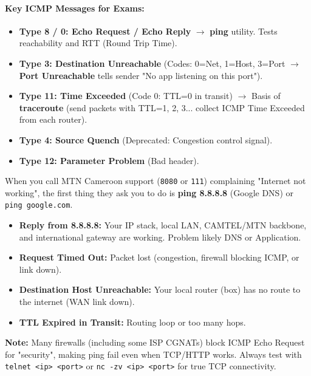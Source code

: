 \documentclass[11pt]{article}
\begin{document}
\paragraph{Key ICMP Messages for Exams:}
\begin{itemize}
    \item \textbf{Type 8 / 0: Echo Request / Echo Reply} $\to$ \textbf{ping} utility. Tests reachability and RTT (Round Trip Time).
    \item \textbf{Type 3: Destination Unreachable} (Codes: 0=Net, 1=Host, 3=Port $\to$ \textbf{Port Unreachable} tells sender "No app listening on this port").
    \item \textbf{Type 11: Time Exceeded} (Code 0: TTL=0 in transit) $\to$ Basis of \textbf{traceroute} (send packets with TTL=1, 2, 3... collect ICMP Time Exceeded from each router).
    \item \textbf{Type 4: Source Quench} (Deprecated: Congestion control signal).
    \item \textbf{Type 12: Parameter Problem} (Bad header).
\end{itemize}

\begin{savaistu}
When you call MTN Cameroon support (\texttt{8080} or \texttt{111}) complaining "Internet not working", the first thing they ask you to do is \textbf{ping 8.8.8.8} (Google DNS) or \texttt{ping google.com}.
\begin{itemize}
    \item \textbf{Reply from 8.8.8.8:} Your IP stack, local LAN, CAMTEL/MTN backbone, and international gateway are working. Problem likely DNS or Application.
    \item \textbf{Request Timed Out:} Packet lost (congestion, firewall blocking ICMP, or link down).
    \item \textbf{Destination Host Unreachable:} Your local router (box) has no route to the internet (WAN link down).
    \item \textbf{TTL Expired in Transit:} Routing loop or too many hops.
\end{itemize}
\textbf{Note:} Many firewalls (including some ISP CGNATs) block ICMP Echo Request for "security", making ping fail even when TCP/HTTP works. Always test with \texttt{telnet <ip> <port>} or \texttt{nc -zv <ip> <port>} for true TCP connectivity.
\end{savaistu}
\end{document}
